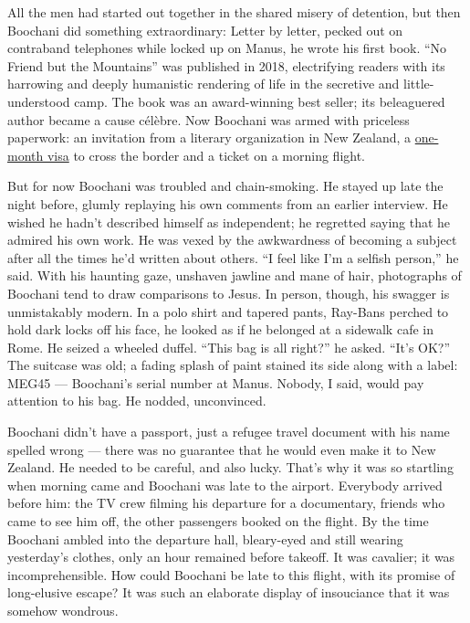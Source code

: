 All the men had started out together in the shared misery of detention,
but then Boochani did something extraordinary: Letter by letter, pecked
out on contraband telephones while locked up on Manus, he wrote his
first book. ``No Friend but the Mountains'' was published in 2018,
electrifying readers with its harrowing and deeply humanistic rendering
of life in the secretive and little-understood camp. The book was an
award-winning best seller; its beleaguered author became a cause
célèbre. Now Boochani was armed with priceless paperwork: an invitation
from a literary organization in New Zealand, a
\href{https://www.nytimes3xbfgragh.onion/2019/11/14/world/australia/behrouz-boochani-refugee.html}{one-month
visa} to cross the border and a ticket on a morning flight.

But for now Boochani was troubled and chain-smoking. He stayed up late
the night before, glumly replaying his own comments from an earlier
interview. He wished he hadn't described himself as independent; he
regretted saying that he admired his own work. He was vexed by the
awkwardness of becoming a subject after all the times he'd written about
others. ``I feel like I'm a selfish person,'' he said. With his haunting
gaze, unshaven jawline and mane of hair, photographs of Boochani tend to
draw comparisons to Jesus. In person, though, his swagger is
unmistakably modern. In a polo shirt and tapered pants, Ray-Bans perched
to hold dark locks off his face, he looked as if he belonged at a
sidewalk cafe in Rome. He seized a wheeled duffel. ``This bag is all
right?'' he asked. ``It's OK?'' The suitcase was old; a fading splash of
paint stained its side along with a label: MEG45 --- Boochani's serial
number at Manus. Nobody, I said, would pay attention to his bag. He
nodded, unconvinced.

Boochani didn't have a passport, just a refugee travel document with his
name spelled wrong --- there was no guarantee that he would even make it
to New Zealand. He needed to be careful, and also lucky. That's why it
was so startling when morning came and Boochani was late to the airport.
Everybody arrived before him: the TV crew filming his departure for a
documentary, friends who came to see him off, the other passengers
booked on the flight. By the time Boochani ambled into the departure
hall, bleary-eyed and still wearing yesterday's clothes, only an hour
remained before takeoff. It was cavalier; it was incomprehensible. How
could Boochani be late to this flight, with its promise of long-elusive
escape? It was such an elaborate display of insouciance that it was
somehow wondrous.

